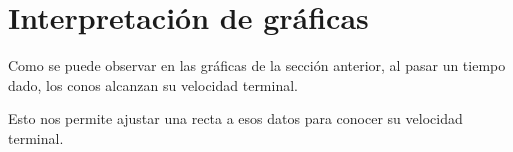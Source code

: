 \section{Interpretación de gráficas}

Como se puede observar en las gráficas de la sección anterior, 
al pasar un tiempo dado, los conos alcanzan su velocidad terminal.

Esto nos permite ajustar una recta a esos datos para conocer su velocidad
terminal.
